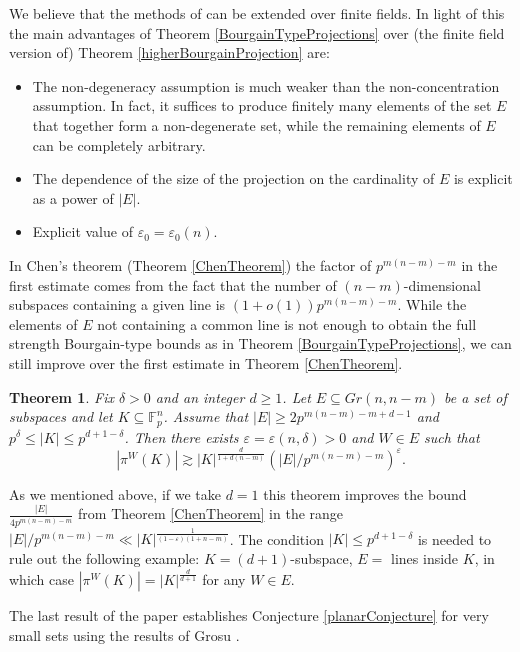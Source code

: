 \documentclass{amsart}
\newtheorem{theorem}{Theorem}[section]
\newcommand{\F}{\mathbb F}
\begin{document}
We believe that the methods of \cite{He18} can be extended over finite fields. In light of this the main advantages of Theorem \ref{BourgainTypeProjections} over (the finite field version of) Theorem \ref{higherBourgainProjection} are:
\begin{itemize}
    \item The non-degeneracy assumption is much weaker than the non-concentration assumption. In fact, it suffices to produce finitely many elements of the set $E$ that together form a non-degenerate set, while the remaining elements of $E$ can be completely arbitrary.
    \item The dependence of the size of the projection on the cardinality of $E$ is explicit as a power of $|E|$.
    \item Explicit value of $\varepsilon_0 = \varepsilon_0(n)$.
\end{itemize}

In Chen's theorem (Theorem \ref{ChenTheorem}) the factor of $p^{m(n - m) - m}$ in the first estimate comes from the fact that the number of $(n - m)$-dimensional subspaces containing a given line is $(1 + o(1))p^{m(n - m) - m}$. While the elements of $E$ not containing a common line is not enough to obtain the full strength Bourgain-type bounds as in Theorem \ref{BourgainTypeProjections}, we can still improve over the first estimate in Theorem \ref{ChenTheorem}.

\begin{theorem} \label{improvementTheorem}
    Fix $\delta > 0$ and an integer $d \geq 1$. Let $E \subseteq Gr(n, n - m)$ be a set of subspaces and let $K \subseteq \F_p^n$. Assume that $|E| \geq 2p^{m(n - m) - m + d - 1}$ and $p^\delta \leq |K| \leq p^{d + 1- \delta}$. Then there exists $\varepsilon = \varepsilon(n, \delta) > 0$ and $W \in E$ such that $$|\pi^{W}(K)| \gtrsim |K|^\frac{d}{1 + d(n - m)}(|E|/p^{m(n - m) - m})^\varepsilon.$$
\end{theorem}

As we mentioned above, if we take $d = 1$ this theorem improves the bound $\frac{|E|}{4p^{m(n - m) - m}}$ from Theorem \ref{ChenTheorem} in the range $|E|/p^{m(n - m) - m} \ll |K|^\frac{1}{(1 - \varepsilon)(1 + n - m)}$. The condition $|K| \leq p^{d + 1 - \delta}$ is needed to rule out the following example: $K = (d + 1)$-subspace, $E = $ lines inside $K$, in which case $|\pi^{W}(K)| = |K|^\frac{d}{d + 1}$ for any $W \in E$.

The last result of the paper establishes 
Conjecture \ref{planarConjecture} for very small sets using the results of Grosu \cite{Gro13}.
\end{document}
